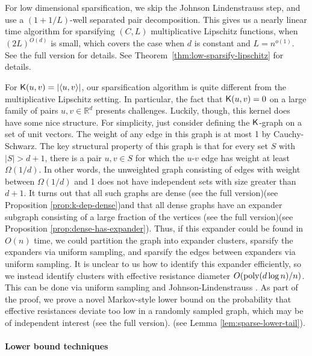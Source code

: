 For low dimensional sparsification, we skip the Johnson Lindenstrauss step, and use a $(1+1/L)$-well separated pair decomposition. This gives us a nearly linear time algorithm for sparsifying $(C, L)$ multiplicative Lipschitz functions, when $(2L)^{O(d)}$ is small, which covers the case when $d$ is constant and $L=n^{o(1)}$. 
\ifdefined\isfocs 
See the full version for details.
\else 
See Theorem~\ref{thm:low-sparsify-lipschitz} for details.
\fi

For $\mathsf{K}(u,v) = |\langle u,v\rangle|$, our sparsification algorithm is quite different from the multiplicative Lipschitz setting. In particular, the fact that $\mathsf{K}(u,v) = 0$ on a large family of pairs $u,v\in \mathbb{R}^d$ presents challenges. Luckily, though, this kernel does have some nice structure. For simplicity, just consider defining the $\mathsf{K}$-graph on a set of unit vectors. The weight of any edge in this graph is at most 1 by Cauchy-Schwarz. The key structural property of this graph is that for every set $S$ with $|S| > d+1$, there is a pair $u,v\in S$ for which the $u$-$v$ edge has weight at least $\Omega(1/d)$. In other words, the unweighted graph consisting of edges with weight between $\Omega(1/d)$ and 1 does not have independent sets with size greater than $d+1$. It turns out that all such graphs are dense  \ifdefined\isfocs(see the full version)\else(see Proposition \ref{prop:k-dep-dense})\fi and that all dense graphs have an expander subgraph consisting of a large fraction of the vertices \ifdefined\isfocs(see the full version)\else(see Proposition \ref{prop:dense-has-expander})\fi. Thus, if this expander could be found in $O(n)$ time, we could partition the graph into expander clusters, sparsify the expanders via uniform sampling, and sparsify the edges between expanders via uniform sampling. It is unclear to us how to identify this expander efficiently, so we instead identify clusters with effective resistance diameter $O(\mathrm{poly}(d\log n)/n)$. This can be done via uniform sampling and Johnson-Lindenstrauss \cite{ss11}. As part of the proof, we prove a novel Markov-style lower bound on the probability that effective resistances deviate too low in a randomly sampled graph, which may be of independent interest  
\ifdefined\isfocs
(see the full version).
\else(see Lemma \ref{lem:sparse-lower-tail}).
\fi

\paragraph*{Lower bound techniques}

